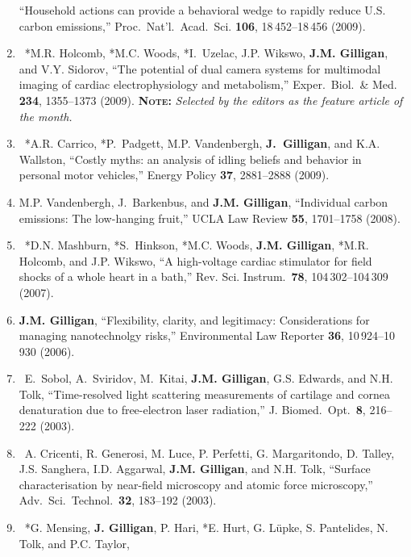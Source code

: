 \begin{enumerate}
    \enquote{Household actions can provide a behavioral wedge to rapidly reduce {U}.{S}. carbon emissions,}  
     Proc.\ Nat'l.\ Acad.\ Sci.{} \textbf{106}, 18\,452--18\,456 (2009).
%	
    \item
    \textdagger\ 
    *M.R. Holcomb, *M.C. Woods, *I.~Uzelac, J.P. Wikswo, \textbf{J.M. Gilligan}, and V.Y. Sidorov, 
    \enquote{The potential of dual camera systems for multimodal imaging of cardiac electrophysiology and metabolism,} 
    Exper.\ Biol.\ \& Med.{} \textbf{234}, 1355--1373 (2009). 
    {\bfseries\scshape Note:} \emph{Selected by the editors as the feature article of the month.}  
%	
    \item
    \textdagger\ 
    *A.R. Carrico, *P.~Padgett, M.P. Vandenbergh, \textbf{J.~Gilligan}, and K.A. Wallston, 
    \enquote{Costly myths: an analysis of idling beliefs and behavior in personal motor vehicles,}  
    Energy Policy \textbf{37}, 2881--2888 (2009).  
%	
    \item
    M.P. Vandenbergh, J.~Barkenbus, and \textbf{J.M. Gilligan}, 
    \enquote{Individual carbon emissions: The low-hanging fruit,}  
    UCLA Law Review \textbf{55}, 1701--1758 (2008).  
%	
    \item
    \textdagger\ 
    *D.N. Mashburn, *S.~Hinkson, *M.C. Woods, \textbf{J.M. Gilligan}, *M.R. Holcomb, and J.P. Wikswo, 
    \enquote{A high-voltage cardiac stimulator for field shocks of a whole heart in a bath,}  
    Rev. Sci. Instrum.\ \textbf{78}, 104\,302--104\,309 (2007).  
%	
	\item
    \textbf{J.M. Gilligan}, 
	\enquote{Flexibility, clarity, and legitimacy: Considerations for managing nanotechnolgy risks,}  
    Environmental Law Reporter \textbf{36}, 10\,924--10\,930 (2006).  
%	
	\item
	\textdagger\ 
    E.~Sobol, A.~Sviridov, M.~Kitai, \textbf{J.M. Gilligan}, G.S. Edwards, and N.H. Tolk, 
    \enquote{Time-resolved light scattering measurements of cartilage and cornea denaturation due to free-electron laser radiation,}  
    J. Biomed.\ Opt.\ \textbf{8}, 216--222 (2003). 
%	
    \item
    \textdagger\ 
    A. Cricenti, R. Generosi, M. Luce, P. Perfetti, G. Margaritondo, D. Talley, J.S. Sanghera,  I.D. Aggarwal, \textbf{J.M. Gilligan}, and N.H. Tolk, 
    \enquote{Surface characterisation by near-field microscopy and atomic force microscopy,} 
    Adv.\ Sci.\ Technol.\ \textbf{32}, 183--192 (2003).
%
    \item 
    \textdagger\ 
    *G. Mensing, \textbf{J. Gilligan}, P. Hari, *E. Hurt, G. L\"upke, S. Pantelides, N. Tolk, and P.C. Taylor, 

\end{enumerate}
